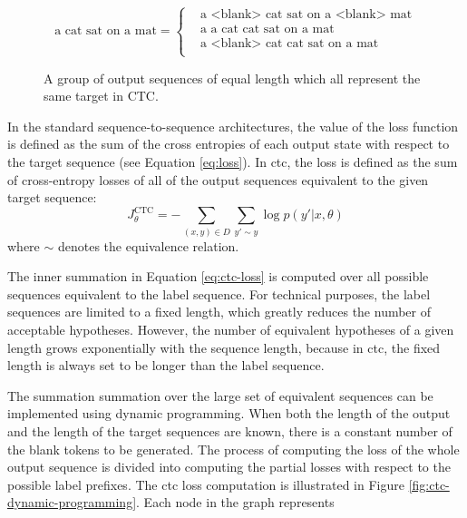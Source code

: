 \begin{figure}
  \centering
  \begin{minipage}{\textwidth}
    \begin{equation*}
        \text{a cat sat on a mat} =
        \begin{cases}
          & \text{a <blank> cat sat on a <blank> mat} \\
          & \text{a a cat cat sat on a mat} \\
          & \text{a <blank> cat cat sat on a mat} \\
        \end{cases}
    \end{equation*}
  \end{minipage}
  \caption{A group of output sequences of equal length which all represent the
    same target in CTC.} %
  \label{fig:ctc-equivalent-sequences}
\end{figure}

In the standard sequence-to-sequence architectures, the value of the loss
function is defined as the sum of the cross entropies of each output state with
respect to the target sequence (see Equation \ref{eq:loss}). In \gls{ctc}, the
loss is defined as the sum of cross-entropy losses of all of the output
sequences equivalent to the given target sequence:
%
\begin{equation}
  J_{\theta}^{\text{CTC}} = - \sum_{(x, y) \in D} \sum_{y' \sim y}  \log p(y' | x, \theta)
  \label{eq:ctc-loss}
\end{equation}
%
where $\sim$ denotes the equivalence relation.  

The inner summation in Equation \ref{eq:ctc-loss} is computed over all possible
sequences equivalent to the label sequence. For technical purposes, the label
sequences are limited to a fixed length, which greatly reduces the number of
acceptable hypotheses. However, the number of equivalent hypotheses of a given
length grows exponentially with the sequence length, because in \gls{ctc}, the
fixed length is always set to be longer than the label sequence.

The summation summation over the large set of equivalent sequences can be
implemented using dynamic programming. When both the length of the output and
the length of the target sequences are known, there is a constant number of the
blank tokens to be generated. The process of computing the loss of the whole
output sequence is divided into computing the partial losses with respect to
the possible label prefixes. The \gls{ctc} loss computation is illustrated in
Figure \ref{fig:ctc-dynamic-programming}. Each node in the graph represents

